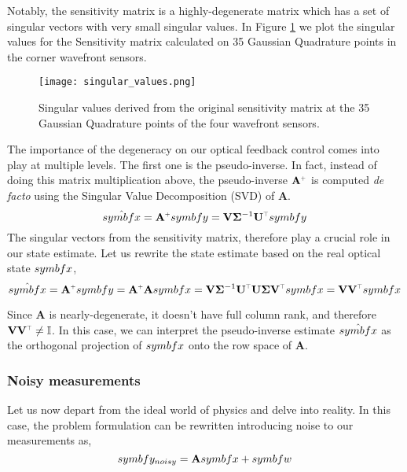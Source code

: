 \documentclass[SE,authoryear,toc]{lsstdoc}
\renewcommand{\v}[1]{\mathbf{#1}}
\newcommand{\plus}{\scalebox{0.6}{$+$}}
\newcommand{\tr}{\scalebox{0.6}{$\top$}}
\begin{document}
Notably, the sensitivity matrix is a highly-degenerate matrix which has a set of singular vectors with very small singular values. In Figure \ref{fig1} we plot the singular values for the Sensitivity matrix calculated on 35 Gaussian Quadrature points in the corner wavefront sensors. 

\begin{figure}[h!]
    \centering
    \texttt{[image: singular\_values.png]}
    \caption{Singular values derived from the original sensitivity matrix at the 35 Gaussian Quadrature points of the four wavefront sensors.}
    \label{fig1}
\end{figure}

The importance of the degeneracy on our optical feedback control comes into play at multiple levels. The first one is the pseudo-inverse. In fact, instead of doing this matrix multiplication above, the pseudo-inverse $\v{A}^{\plus}$ is computed \textit{de facto} using the Singular Value Decomposition (SVD) of $\v{A}$.
\begin{equation}
     \hat{\\symbf{x}} = \v{A}^{\plus}\\symbf{y} = \v{V} \v{\Sigma}^{-1} \v{U^{\tr}}\\symbf{y}
\end{equation}
The singular vectors from the sensitivity matrix, therefore play a crucial role in our state estimate. Let us rewrite the state estimate based on the real optical state $\\symbf{x}$,
\begin{equation}
     \hat{\\symbf{x}} = \v{A}^{\plus}\\symbf{y} = \v{A}^{\plus}\v{A}\\symbf{x} = \v{V}\v{\Sigma}^{-1} \v{U^{\tr}}\v{U} \v{\Sigma} \v{V^{\tr}}\\symbf{x} =  \v{V}\v{V^{\tr}}\\symbf{x}
\end{equation}

Since $\v{A}$ is nearly-degenerate, it doesn't have full column rank, and therefore $\v{V}\v{V^{\tr}} \neq \mathbb{I}$. In this case, we can interpret the pseudo-inverse estimate $\hat{\\symbf{x}}$ as the orthogonal projection of $\\symbf{x}$ onto the row space of $\v{A}$. 


\subsubsection*{Noisy measurements}
Let us now depart from the ideal world of physics and delve into reality. In this case, the problem formulation can be rewritten introducing noise to our measurements as,
\begin{equation}
    \\symbf{y}_{noisy} = \v{A} \\symbf{x} + \\symbf{w}
\end{equation}
\end{document}
